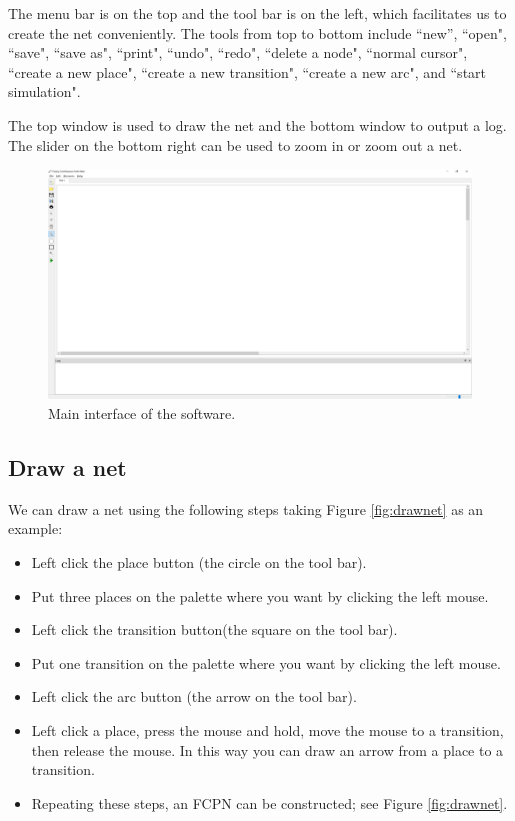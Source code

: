 \documentclass[journal,a4paper,onecolumn]{article}
\begin{document}
The menu bar is on the top and the tool bar is on the left, which facilitates us to create the net conveniently. The tools from top to bottom include ``new'', ``open", ``save", ``save as", ``print", ``undo", ``redo", ``delete a node", ``normal cursor", ``create a new place", ``create a new transition", ``create a new arc", and ``start simulation". 

The top window is used to draw the net and the bottom window to output a log. The slider on the bottom right can be used to zoom in or zoom out a net.

\begin{figure}[!hbt]
	\begin{center}
		\includegraphics[width=\columnwidth]{fig1}
		\caption{Main interface of the software.}
		\label{fig:Maininterface}
	\end{center}
\end{figure}



\subsection{Draw a net}
We can draw a net using the following steps taking Figure \ref{fig:drawnet} as an example: 

\begin{itemize}
	\item Left click the place button (the circle on the tool bar).
	\item Put three places on the palette where you want by clicking the left mouse.
	\item Left click the transition button(the square on the tool bar).
	\item Put one transition on the palette where you want by clicking the left mouse.
	\item Left click the arc button (the arrow on the tool bar).
	\item Left click a place, press the mouse and hold, move the mouse to a transition, then release the mouse. In this way you can draw an arrow from a place to a transition.
	\item Repeating these steps, an FCPN can be constructed; see Figure \ref{fig:drawnet}.
\end{itemize}
\end{document}
